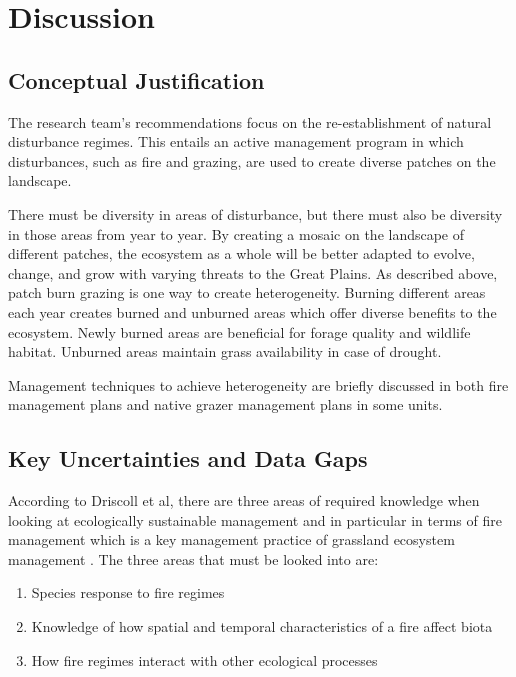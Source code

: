 \hypertarget{discussion}{%
\section{Discussion }\label{discussion}}

\hypertarget{conceptual-justification}{%
\subsection{Conceptual Justification}\label{conceptual-justification}}

The research team's recommendations focus on the re-establishment of natural disturbance regimes. 
This entails an active management program in which disturbances, such as fire and grazing, are used to create diverse patches on the landscape.

There must be diversity in areas of disturbance, but there must also be diversity in those areas from year to year.
By creating a mosaic on the landscape of different patches, the ecosystem as a whole will be better adapted to evolve, change, and grow with varying threats to the Great Plains. 
As described above, patch burn grazing is one way to create heterogeneity. 
Burning different areas each year creates burned and unburned areas which offer diverse benefits to the ecosystem. 
Newly burned areas are beneficial for forage quality and wildlife habitat.
Unburned areas maintain grass availability in case of drought.

Management techniques to achieve heterogeneity are briefly discussed in both fire management plans and native grazer management plans in some units.

\hypertarget{key-uncertainties-and-data-gaps-1}{%
\subsection{Key Uncertainties and Data Gaps
}\label{key-uncertainties-and-data-gaps-1}}

According to Driscoll et al, there are three areas of required knowledge when looking at ecologically sustainable management and in particular in terms of fire management which is a key management practice of grassland ecosystem management \citep{driscoll2010}. 
The three areas that must be looked into are:

\begin{enumerate}
\item Species response to fire regimes
\item Knowledge of how spatial and temporal characteristics of a fire affect biota
\item How fire regimes interact with other ecological processes
\end{enumerate}

